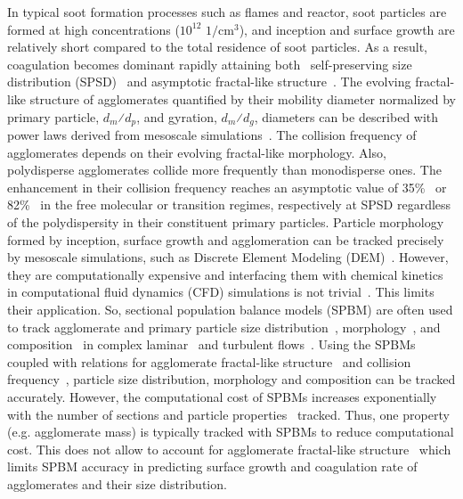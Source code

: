 In typical soot formation processes such as flames and reactor, soot particles are formed at high concentrations ($\mathrm{10^{12}}$ $\mathrm{1/cm^3}$), and inception and surface growth are relatively short compared to the total residence of soot particles. As a result, coagulation becomes dominant rapidly attaining both~\citep{Goudeli2016}
self-preserving size distribution (SPSD)~\citep{lai1972self} and asymptotic fractal-like structure~\citep{mountain1986simulation}.
The evolving fractal-like structure of agglomerates quantified by their mobility diameter normalized by primary particle, $d_m$⁄$d_p$, and gyration, $d_m$⁄$d_g$, diameters can be described with power laws derived from mesoscale simulations~\citep{Kelesidis2017}. The collision frequency of agglomerates depends on their evolving fractal-like morphology. Also, polydisperse agglomerates collide more frequently than monodisperse ones. The enhancement in their collision frequency reaches an asymptotic value of 35\%~\citep{Goudeli2016} or 82\%~\citep{kelesidis2021self} in the free molecular or transition regimes, respectively at SPSD regardless of the polydispersity in their constituent primary particles. Particle morphology formed by inception, surface growth and agglomeration can be tracked precisely by mesoscale simulations, such as Discrete Element Modeling (DEM)~\citep{Kelesidis2017Flame}. However, they are computationally expensive and interfacing them with chemical kinetics in computational fluid dynamics (CFD) simulations is not trivial~\citep{kelesidis2021perspective}. This limits their application. So, sectional population balance models (SPBM) are often used to track agglomerate and primary particle size distribution~\citep{Xiong1993}, morphology~\citep{park2005aerosol}, and composition~\citep{kholghy2016core} in complex laminar~\citep{kholghy2016core} and turbulent flows~\citep{schiener2019transported}. Using the SPBMs coupled with relations for agglomerate fractal-like structure~\citep{matsoukas1991dynamics} and collision frequency~\citep{fuchs1964mechanics}, particle size distribution, morphology and composition can be tracked accurately. However, the computational cost of SPBMs increases exponentially with the number of sections\citep{xiong1993formation} and particle properties~\citep{kholghy2016core} tracked. Thus, one property (e.g. agglomerate mass) is typically tracked with SPBMs to reduce computational cost. This does not allow to account for agglomerate fractal-like structure~\citep{smooke2005soot, aubagnac2018soot} which limits SPBM accuracy in predicting surface growth and coagulation rate of agglomerates and their size distribution.

